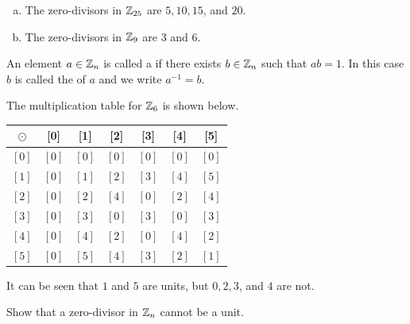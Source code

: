 \documentclass[11pt,fleqn,dvipsnames,usenames]{article}
\newcommand{\p}{\noindent}
\begin{document}
\begin{examples}\phantom{-}

\begin{enumerate}[(a)]
\item The zero-divisors in $\mathbb{Z}_{25}$ are $5, 10, 15$, and $20$.
\item The zero-divisors in $\mathbb{Z}_9$ are $3$ and $6$.
\end{enumerate}
\end{examples}
%
\begin{definition}
An element $a\in\mathbb{Z}_{n}$ is called a  if there exists $b\in \mathbb{Z}_{n}$ such that $ab = 1$.  In this case $b$ is called the  of $a$ and we write $a^{-1} = b$.
\end{definition}
%
\newpage
%
\begin{example}
The multiplication table for $\mathbb{Z}_6$ is shown below.  
\bgroup
\begin{center}
\def\arraystretch{1.5}
\begin{tabular}{c|cccccc}
$\odot$ & [0] & [1] & [2] & [3] & [4] & [5]\\
\hline
$[0]$ & $[0]$ & $[0]$ & $[0]$ & $[0]$ & $[0]$ & $[0]$\\
$[1]$ & $[0]$ & $[1]$ & $[2]$ & $[3]$ & $[4]$ & $[5]$\\
$[2]$ & $[0]$ & $[2]$ & $[4]$ & $[0]$ & $[2]$ & $[4]$\\
$[3]$ & $[0]$ & $[3]$ & $[0]$ & $[3]$ & $[0]$ & $[3]$\\
$[4]$ & $[0]$ & $[4]$ & $[2]$ & $[0]$ & $[4]$ & $[2]$\\
$[5]$ & $[0]$ & $[5]$ & $[4]$ & $[3]$ & $[2]$ & $[1]$ 
\end{tabular}
\end{center}
\egroup
\p It can be seen that $1$ and $5$ are units, but $0,2,3$, and $4$ are not.
\end{example}

\begin{exercise}\label{zerodivisorcannotbeunitZn} Show that a zero-divisor in $\mathbb{Z}_{n}$ cannot be a unit.\end{exercise}
\end{document}
